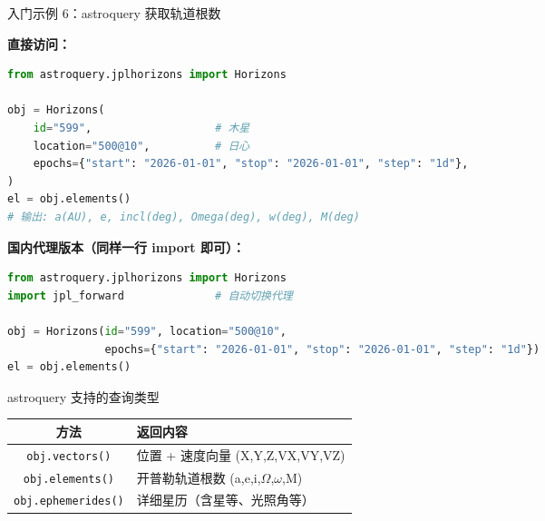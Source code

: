 \documentclass[aspectratio=169]{ctexbeamer}
\begin{document}
\begin{frame}{入门示例 6：astroquery 获取轨道根数}
\small

\textbf{直接访问：}

\begin{lstlisting}[language=python]
from astroquery.jplhorizons import Horizons

obj = Horizons(
    id="599",                   # 木星
    location="500@10",          # 日心
    epochs={"start": "2026-01-01", "stop": "2026-01-01", "step": "1d"},
)
el = obj.elements()
# 输出: a(AU), e, incl(deg), Omega(deg), w(deg), M(deg)
\end{lstlisting}

\vspace{0.15cm}

\textbf{国内代理版本（同样一行 import 即可）：}

\begin{lstlisting}[language=python]
from astroquery.jplhorizons import Horizons
import jpl_forward              # 自动切换代理

obj = Horizons(id="599", location="500@10",
               epochs={"start": "2026-01-01", "stop": "2026-01-01", "step": "1d"})
el = obj.elements()
\end{lstlisting}

\vspace{0.15cm}

\begin{block}{astroquery 支持的查询类型}
\small
\begin{tabular}{c|l}
\toprule
\textbf{方法} & \textbf{返回内容} \\
\midrule
\texttt{obj.vectors()}   & 位置 + 速度向量 (X,Y,Z,VX,VY,VZ) \\
\texttt{obj.elements()}  & 开普勒轨道根数 (a,e,i,$\Omega$,$\omega$,M) \\
\texttt{obj.ephemerides()} & 详细星历（含星等、光照角等） \\
\bottomrule
\end{tabular}
\end{block}
\end{frame}
\end{document}
